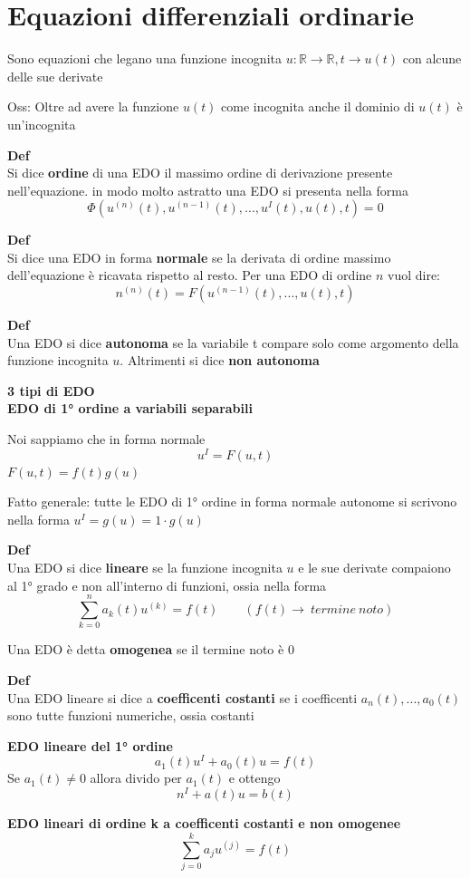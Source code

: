 \documentclass[12pt, a4paper]{article}
\begin{document}
\newpage
\section{Equazioni differenziali ordinarie}
Sono equazioni che legano una funzione incognita $u:\mathbb{R}\to\mathbb{R}, t\to u(t)$ con alcune delle sue
derivate

Oss: Oltre ad avere la funzione $u(t)$ come incognita anche il dominio di $u(t)$ è un'incognita

\textbf{Def}\\Si dice \textbf{ordine} di una EDO il massimo ordine di derivazione presente nell'equazione.
in modo molto astratto una EDO si presenta nella forma
\[\Phi(u^{(n)}(t),u^{(n-1)}(t),...,u^{I}(t),u(t),t)=0\]

\textbf{Def}\\Si dice una EDO in forma \textbf{normale} se la derivata di ordine massimo dell'equazione è ricavata
rispetto al resto. Per una EDO di ordine $n$ vuol dire:\[n^{(n)}(t)=F(u^{(n-1)}(t),...,u(t),t)\]

\textbf{Def}\\Una EDO si dice \textbf{autonoma} se la variabile t compare solo come argomento della funzione
incognita $u$. Altrimenti si dice \textbf{non autonoma}

\textbf{3 tipi di EDO\\EDO di 1° ordine a variabili separabili}

Noi sappiamo che in forma normale \[u^{I}=F(u,t)\]
$F(u,t)=f(t)g(u)$

Fatto generale: tutte le EDO di 1° ordine in forma normale autonome si scrivono nella forma
$u^{I}=g(u)=1\cdot g(u)$

\textbf{Def}\\Una EDO si dice \textbf{lineare} se la funzione incognita $u$ e le sue derivate compaiono al 1° grado
e non all'interno di funzioni, ossia nella forma \[\sum^{n}_{k=0}a_{k}(t)u^{(k)}=f(t)\qquad(f(t)\to\ termine\ noto)\]

Una EDO è detta \textbf{omogenea} se il termine noto è 0

\textbf{Def}\\Una EDO lineare si dice a \textbf{coefficenti costanti} se i coefficenti $a_{n}(t),...,a_{0}(t)$
sono tutte funzioni numeriche, ossia costanti

\textbf{EDO lineare del 1° ordine}\[a_{1}(t)u^{I}+a_{0}(t)u=f(t)\] Se $a_{1}(t)\neq 0$ allora divido per $a_{1}(t)$
e ottengo \[n^{I}+a(t)u=b(t)\]

\textbf{EDO lineari di ordine k a coefficenti costanti e non omogenee}\[\sum^{k}_{j=0}a_{j}u^{(j)}=f(t)\]
\end{document}
